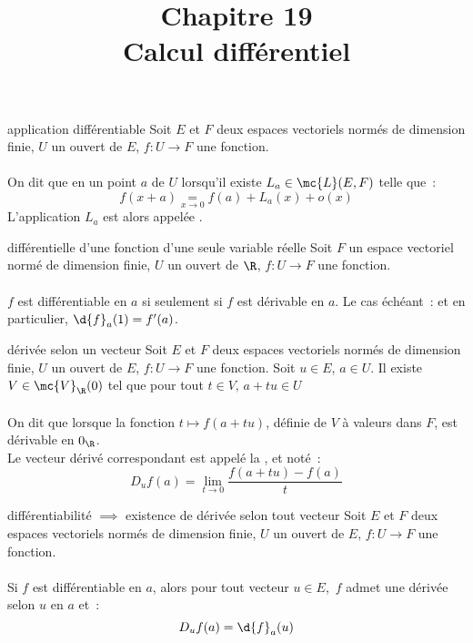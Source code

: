 

\setcounter{chapitre}{19}

\title{\Large Chapitre 19 \\ \Huge Calcul différentiel}



\maketitle

\begin{definition}{19.1}{application différentiable}
    Soit $E$ et $F$ deux espaces vectoriels normés de dimension finie, $U$ un ouvert de $E$, $f:U\to F$ une fonction.\\\\
    On dit que  en un point $a$ de $U$ lorsqu'il existe $L_a \in \mc{L}(E,F)$ telle que~:
    $$f(x+a) \underset{x \to 0}{=} f(a) + L_a(x) + o(x)$$
    L'application $L_a$ est alors appelée .
\end{definition}

\begin{proposition}{19.7}{différentielle d'une fonction d'une seule variable réelle}
    Soit $F$ un espace vectoriel normé de dimension finie, $U$ un ouvert de $\R$, $f:U\to F$ une fonction.\\\\
    $f$ est différentiable en $a$ si seulement si $f$ est dérivable en $a$. Le cas échéant~:
    et en particulier, $\d{f}_a(1) = f'(a)$.
\end{proposition}

\begin{definition}{19.8}{dérivée selon un vecteur}
    Soit $E$ et $F$ deux espaces vectoriels normés de dimension finie, $U$ un ouvert de $E$, $f:U\to F$ une fonction. Soit $u \in E$, $a \in U$. Il existe $V \in \mc{V}_\R(0)$ tel que pour tout $t \in V,\, a+tu \in U$\\\\
    On dit que  lorsque la fonction $t \mapsto f(a + tu)$, définie de $V$ à valeurs dans $F$, est dérivable en $0_\R$. \\
    Le vecteur dérivé correspondant est appelé la , et noté~:
    $$D_uf(a) = \lim_{t \to 0} \frac{f(a+tu)-f(a)}{t}$$
\end{definition}

\begin{theoreme}{19.9}{différentiabilité $\implies$ existence de dérivée selon tout vecteur}
    Soit $E$ et $F$ deux espaces vectoriels normés de dimension finie, $U$ un ouvert de $E$, $f:U\to F$ une fonction.\\\\
    Si $f$ est différentiable en $a$, alors pour tout vecteur $u \in E$,\, $f$ admet une dérivée selon $u$ en $a$ et~:
    $$D_uf(a) = \d{f}_a(u)$$
\end{theoreme}



